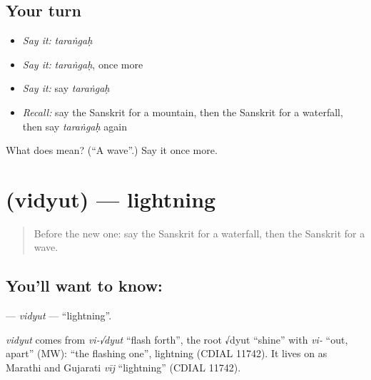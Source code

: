 \subsection*{Your turn}
\begin{itemize}
\raggedright
  \item \emph{Say it:} \emph{taraṅgaḥ}
  \item \emph{Say it:} \emph{taraṅgaḥ}, once more
  \item \emph{Say it:} say \emph{taraṅgaḥ}
  \item \emph{Recall:} say the Sanskrit for a mountain, then the Sanskrit for a waterfall, then say \emph{taraṅgaḥ} again
\end{itemize}

\begin{tcolorbox}[breakable,colback=teal!4,colframe=teal!35!black,title={Before you move on}]
What does  mean? (\textquotedblleft{}A wave\textquotedblright{}.) Say it once more.
\end{tcolorbox}
\section[\texorpdfstring{\sk{विद्युत्} (vidyut)}{विद्युत् (vidyut)}]{ (vidyut) — lightning}

\label{lesson:SA-C110-vidyut}



\begin{quote}
Before the new one: say the Sanskrit for a waterfall, then the Sanskrit for a wave.
\end{quote}

\subsection*{You'll want to know: }
\textbf{} — \emph{vidyut} — \textquotedblleft{}lightning\textquotedblright{}.

\begin{cousinweb}
\emph{vidyut} comes from \emph{vi-√dyut} \textquotedblleft{}flash forth\textquotedblright{}, the root √dyut \textquotedblleft{}shine\textquotedblright{} with \emph{vi-} \textquotedblleft{}out, apart\textquotedblright{} (MW): \textquotedblleft{}the flashing one\textquotedblright{}, lightning (CDIAL 11742). It lives on as Marathi and Gujarati \emph{vīj} \textquotedblleft{}lightning\textquotedblright{} (CDIAL 11742).
\end{cousinweb}

